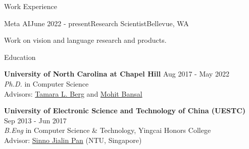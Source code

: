 \documentclass{resume} %
\begin{document}

\begin{rSection}{Work Experience}


    \begin{rSubsection}{Meta AI}{June 2022 - present}{Research Scientist}{Bellevue, WA}
        \item Work on vision and language research and products.
    \end{rSubsection}    

    \end{rSection}


\begin{rSection}{Education}

{\bf University of North Carolina at Chapel Hill} \hfill {Aug 2017  -  May 2022} \\ 
{\sl Ph.D.} in Computer Science \\
Advisors: \href{http://www.tamaraberg.com/}{Tamara L. Berg} and \href{http://www.cs.unc.edu/~mbansal/}{Mohit Bansal}

{\bf University of Electronic Science and Technology of China (UESTC)} \hfill {Sep 2013 - Jun 2017} \\ 
{\sl B.Eng} in Computer Science \& Technology, Yingcai Honors College\\
Advisor: \href{https://personal.ntu.edu.sg/sinnopan/}{Sinno Jialin Pan} (NTU, Singapore)
\end{rSection}

\end{document}
